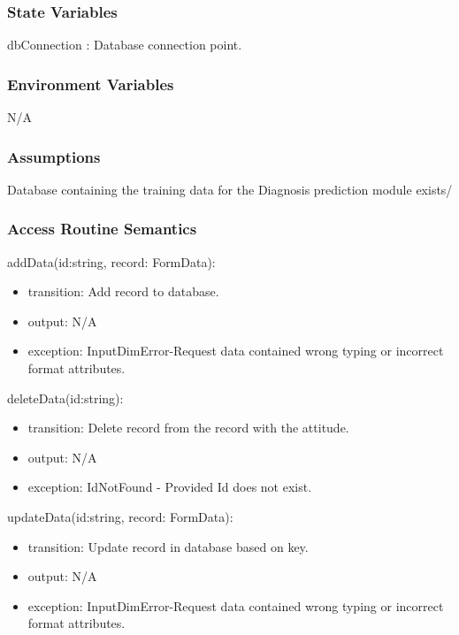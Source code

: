 \documentclass[12pt, titlepage]{article}
\begin{document}
\subsubsection{State Variables}

dbConnection : Database connection point.

\subsubsection{Environment Variables}

N/A

\subsubsection{Assumptions}

Database containing the training data for the Diagnosis prediction module exists/

\subsubsection{Access Routine Semantics}

\noindent addData(id:string, record: FormData):
\begin{itemize}
\item transition: Add record to database.
\item output: N/A
\item exception: InputDimError-Request data contained wrong typing or incorrect format attributes.
\end{itemize}

\noindent deleteData(id:string):
\begin{itemize}
\item transition: Delete record from the record with the attitude.
\item output: N/A
\item exception: IdNotFound - Provided Id does not exist.
\end{itemize}

\noindent updateData(id:string, record: FormData):
\begin{itemize}
\item transition: Update record in database based on key.
\item output: N/A
\item exception: InputDimError-Request data contained wrong typing or incorrect format attributes.
\end{itemize}
\end{document}
